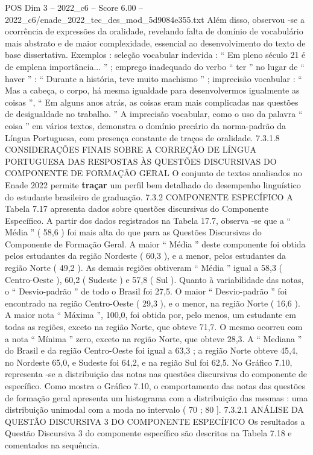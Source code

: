 \begin{textsample}{POS Dim 3 – 2022\_c6 – Score 6.00 – 2022\_c6/enade\_2022\_tec\_des\_mod\_5d9084e355.txt}
Além disso, observou -se a ocorrência de expressões da oralidade, revelando falta de domínio de vocabulário mais abstrato e de maior complexidade, essencial ao desenvolvimento do texto de base dissertativa.
Exemplos : seleção vocabular indevida : “ Em pleno século 21 é de emplena importância... ” ; emprego inadequado do verbo “ ter ” no lugar de “ haver ” : “ Durante a história, teve muito machismo ” ; imprecisão vocabular : “ Mas a cabeça, o corpo, há mesma igualdade para desenvolvermos igualmente as coisas ”, “ Em alguns anos atrás, as coisas eram mais complicadas nas questões de desigualdade no trabalho. ” A imprecisão vocabular, como o uso da palavra “ coisa ” em vários textos, demonstra o domínio precário da norma-padrão da Língua Portuguesa, com presença constante de traços de oralidade. 7.3.1.8 CONSIDERAÇÕES FINAIS SOBRE A CORREÇÃO DE LÍNGUA PORTUGUESA DAS RESPOSTAS ÀS QUESTÕES DISCURSIVAS DO COMPONENTE DE FORMAÇÃO GERAL O conjunto de textos analisados no Enade 2022 permite \textbf{traçar} um perfil bem detalhado do desempenho linguístico do estudante brasileiro de graduação. 7.3.2 COMPONENTE ESPECÍFICO A Tabela 7.17 apresenta dados sobre questões discursivas do Componente Específico.
A partir dos dados registrados na Tabela 17.7, observa -se que a “ Média ” ( 58,6 ) foi mais alta do que para as Questões Discursivas do Componente de Formação Geral.
A maior “ Média ” deste componente foi obtida pelos estudantes da região Nordeste ( 60,3 ), e a menor, pelos estudantes da região Norte ( 49,2 ).
As demais regiões obtiveram “ Média ” igual a 58,3 ( Centro-Oeste ), 60,2 ( Sudeste ) e 57,8 ( Sul ).
Quanto à variabilidade das notas, o “ Desvio-padrão ” de todo o Brasil foi 27,5.
O maior “ Desvio-padrão ” foi encontrado na região Centro-Oeste ( 29,3 ), e o menor, na região Norte ( 16,6 ).
A maior nota “ Máxima ”, 100,0, foi obtida por, pelo menos, um estudante em todas as regiões, exceto na região Norte, que obteve 71,7.
O mesmo ocorreu com a nota “ Mínima ” zero, exceto na região Norte, que obteve 28,3.
A “ Mediana ” do Brasil e da região Centro-Oeste foi igual a 63,3 ; a região Norte obteve 45,4, no Nordeste 65,0, e Sudeste foi 64,2, e na região Sul foi 62,5.
No Gráfico 7.10, representa -se a distribuição das notas nas questões discursivas do componente de específico.
Como mostra o Gráfico 7.10, o comportamento das notas das questões de formação geral apresenta um histograma com a distribuição das mesmas : uma distribuição unimodal com a moda no intervalo ( 70 ; 80 ]. 7.3.2.1 ANÁLISE DA QUESTÃO DISCURSIVA 3 DO COMPONENTE ESPECÍFICO Os resultados a Questão Discursiva 3 do componente específico são descritos na Tabela 7.18 e comentados na sequência.

\end{textsample}
